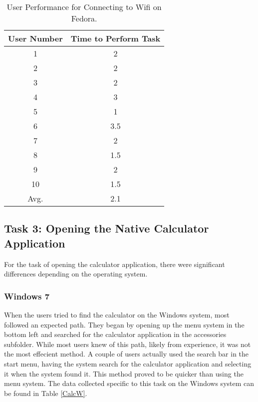 \documentclass[11pt,letterpaper]{report}
\begin{document}
\begin{table}
    \centering
    \begin{tabular}{| c | c |}
        \hline
        User Number & Time to Perform Task \\ \hline
        1 & 2 \\  \hline
        2 & 2 \\  \hline
        3 & 2 \\ \hline
        4 & 3 \\  \hline
        5 & 1 \\    \hline
        6 & 3.5 \\  \hline
        7 & 2 \\ \hline
        8 & 1.5 \\  \hline
        9 & 2 \\ \hline
        10 & 1.5 \\ \hline
        Avg. & 2.1 \\
        \hline
    \end{tabular}
    \caption{User Performance for Connecting to Wifi on Fedora.}
    \label{wifiL}    
\end{table}

\subsection{Task 3: Opening the Native Calculator Application}
For the task of opening the calculator application, there were significant differences depending on the operating system. 

\subsubsection{Windows 7}
When the users tried to find the calculator on the Windows system, most followed an expected path. They began by opening up the menu system in the bottom left and searched for the calculator application in the accessories subfolder. While most users knew of this path, likely from experience, it was not the most effecient method. A couple of users actually used the search bar in the start menu, having the system search for the calculator application and selecting it when the system found it. This method proved to be quicker than using the menu system. The data collected specific to this task on the Windows system can be found in Table \ref{CalcW}.
\end{document}

